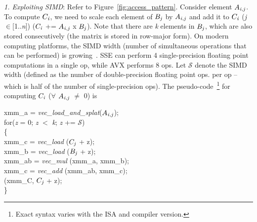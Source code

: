      \vspace*{0.05in}
     {\it{1. Exploiting SIMD}}: Refer to Figure~\ref{fig:access_pattern}. 
     Consider element $A_{{\it{i}},{\it{j}}}$. To compute
     $C_{\it{i}}$, we need to scale each element of
     $B_{{\it{j}}}$ by  $A_{{\it{i}},{\it{j}}}$ and add it to
     $C_{\it{i}}$ ({\it{j}}$\in$[1..{\it{n}}]) ($C_{\it{i}}$ +=
     $A_{{\it{i}},{\it{j}}}$ x $B_{{\it{j}}}$). Note that there are
     {\it{k}} elements in $B_{{\it{j}}}$, which are also stored
     consecutively (the matrix is stored in row-major form).
On modern computing platforms, the SIMD width (number of simultaneous
     operations that can be performed) is
     growing~\cite{intel2}. SSE can perform 4
     single-precision floating point computations in a single op, while
     AVX %
     performs 8 ops. Let $\mathcal{S}$ denote the SIMD width
     (defined as the number of double-precision floating point ops. per op
     -- which is half of the number of single-precision ops).
     The pseudo-code~\footnote{Exact syntax varies with the ISA and
     compiler version.} for computing $C_{\it{i}}$ ($\forall$
     $A_{{\it{i}},{\it{j}}}$ $\neq$ 0) is
     \vspace*{0.03in}

     \hspace*{-0.13in}xmm\_a = {\it{vec\_load\_and\_splat}}($A_{{\it{i}},{\it{j}}}$); \\
     for\hspace*{0.02in}({\it{z}} = 0; {\it{z}} $<$ {\it{k}}; {\it{z}} += $\mathcal{S}$)\\
     \{\\
         \hspace*{0.2in}xmm\_c = {\it{vec\_load}}  ($C_{{\it{j}}}$ + z); \\
         \hspace*{0.2in}xmm\_b = {\it{vec\_load}}  ($B_{{\it{j}}}$ + z); \\
         \hspace*{0.2in}xmm\_ab = {\it{vec\_mul}}  (xmm\_a, xmm\_b); \\
         \hspace*{0.2in}xmm\_c = {\it{vec\_add}}  (xmm\_ab, xmm\_c); \\
          (xmm\_C,  $C_{{\it{j}}}$ + z); \\
     \}\\


